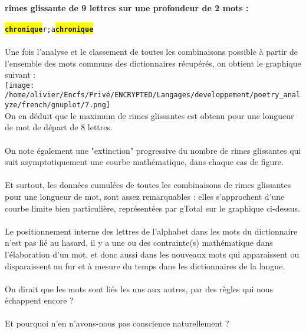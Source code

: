 \documentclass[french]{article}
\begin{document}
\paragraph{rimes glissante de 9 lettres sur une profondeur de 2 mots :\\}
\texttt{\colorbox{yellow}{\textbf{chronique}}r;a\colorbox{yellow}{\textbf{chronique}}}\\
\\Une fois l'analyse et le classement de toutes les combinaisons possible à partir de l'ensemble des mots communs des dictionnaires récupérés, on obtient le graphique suivant :\\
\texttt{[image: /home/olivier/Encfs/Privé/ENCRYPTED/Langages/developpement/poetry\_analyze/french/gnuplot/7.png]}\\
On en déduit que le maximum de rimes glissantes est obtenu pour une longueur de mot de départ de 8 lettres.\\
\\On note également une "extinction" progressive du nombre de rimes glissantes qui suit asymptotiquement une courbe mathématique, dans chaque cas de figure.\\
\\Et surtout, les données cumulées de toutes les combinaisons de rimes glissantes pour une longueur de mot, sont assez remarquables : elles s'approchent d'une courbe limite bien particulière, représentées par gTotal sur le graphique ci-dessus.\\
\\Le positionnement interne des lettres de l'alphabet dans les mots du dictionnaire n'est pas lié au hasard, il y a une ou des contrainte(s) mathématique dans l'élaboration d'un mot, et donc aussi dans les nouveaux mots qui apparaissent ou disparaissent au fur et à mesure du temps dans les dictionnaires de la langue.\\
\\On dirait que les mots sont liés les uns aux autres, par des règles qui nous échappent encore ?\\
\\Et pourquoi n'en n'avons-nous pas conscience naturellement ?\\
\end{document}
